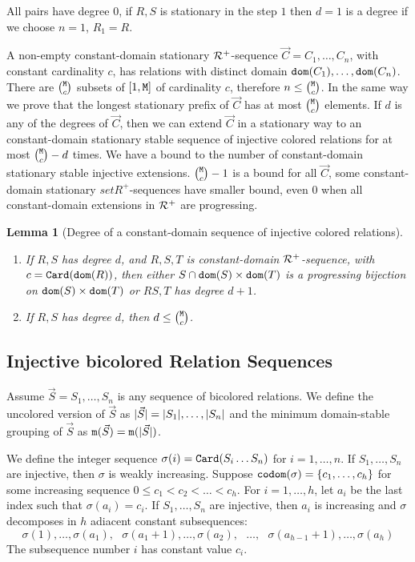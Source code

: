 \documentclass{lmcs}
\newtheorem{lemma}[theorem]{Lemma}
\begin{document}
All pairs have degree $0$, if $R,S$ is stationary in the step $1$ then $d=1$ is a degree
if we choose $n=1$, $R_1 = R$.

A non-empty constant-domain stationary ${\mathcal R}^+$-sequence $\vec{C}=C_1, \ldots, C_n$, 
with constant cardinality $c$,
has relations with distinct domain ${\tt dom}(C_1), \ldots, {\tt dom}(C_n)$. There are 
$\newton{\MaxInd}{c}$ subsets of $[1,{\tt M}]$
of cardinality $c$, therefore $n \le \newton{\MaxInd}{c}$. In the same way
we prove that the longest stationary prefix of $\vec{C}$ has at most
$\newton{\MaxInd}{c}$ elements. If $d$ is any of the degrees of
$\vec{C}$, then we can extend $\vec{C}$ in a stationary way to 
an constant-domain stationary stable sequence of injective colored relations for at most
$\newton{\MaxInd}{c}-d$ times. We have a bound to the
number of constant-domain stationary stable injective extensions. $\newton{\MaxInd}{c}-1$
is a bound for all $\vec{C}$, some constant-domain stationary $setR^+$-sequences
have smaller bound, even $0$ when all constant-domain extensions in ${\mathcal R}^+$
are progressing.

\begin{lemma}[Degree of a constant-domain sequence of injective colored relations]
\label{lemma-degree-constant}
\begin{enumerate}

\item
If $R,S$ has degree $d$,
and $R,S,T$ is constant-domain ${\mathcal R}^+$-sequence, with $c = {\tt Card}({\tt dom}(R))$, then either 
$S \cap {\tt dom}(S) \times {\tt dom}(T)$ is a progressing bijection on ${\tt dom}(S) \times {\tt dom}(T)$
or $RS, T$ has degree $d+1$.

\item
If $R,S$ has degree $d$, then $d \le \newton{\MaxInd}{c}$.
\end{enumerate}
\end{lemma}



\subsection{Injective bicolored Relation Sequences}

Assume $\vec{S} = S_1, \ldots, S_n$ is any sequence of bicolored relations. We define
the uncolored version of $\vec{S}$ as ${| \vec{S} |} = {| S_1 |}, \ldots, 
{| S_n |}$ and the minimum domain-stable grouping of $\vec{S}$ as
${\tt m}(\vec{S}) = {\tt m}({| \vec{S} |})$.

We define the integer sequence $\sigma(i) = {\tt Card}(S_i \ldots S_n)$ for $i=1, \ldots, n$.
If $S_1, \ldots, S_n$ are injective,  then $\sigma$ is weakly increasing.
Suppose ${\tt codom}(\sigma) = \{c_1, \ldots, c_h\}$ for some increasing sequence 
$0 \le c_1 < c_2 < \ldots < c_h$. For $i=1, \ldots, h$, let $a_i$ be the last index such that
$ \sigma(a_i) = c_i$. If $S_1, \ldots, S_n$ are injective, then $a_i$ is increasing
and $\sigma$ decomposes in $h$ adiacent constant subsequences:
$$
\sigma(1), \ldots, \sigma(a_1),
\ \ \
\sigma(a_1+1), \ldots, \sigma(a_2),
\ \ \ 
\ldots,
\ \ \
\sigma(a_{h-1}+1), \ldots, \sigma(a_h)
$$ 
The subsequence number $i$ has constant value $c_i$.
\end{document}
